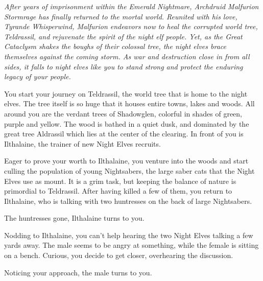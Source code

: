 
\textit{After years of imprisonment within the Emerald Nightmare, Archdruid Malfurion Stormrage has finally returned to the mortal world. Reunited with his love, Tyrande Whisperwind, Malfurion endeavors now to heal the corrupted world tree, Teldrassil, and rejuvenate the spirit of the night elf people. Yet, as the Great Cataclysm shakes the boughs of their colossal tree, the night elves brace themselves against the coming storm. As war and destruction close in from all sides, it falls to night elves like you to stand strong and protect the enduring legacy of your people.}

You start your journey on Teldrassil, the world tree that is home to the night elves. The tree itself is so huge that it houses entire towns, lakes and woods. All around you are the verdant trees of Shadowglen, colorful in shades of green, purple and yellow. The wood is bathed in a quiet dusk, and dominated by the great tree Aldrassil which lies at the center of the clearing. In front of you is Ilthalaine, the trainer of new Night Elves recruits.



Eager to prove your worth to Ilthalaine, you venture into the woods and start culling the population of young Nightsabers, the large saber cats that the Night Elves use as mount. It is a grim task, but keeping the balance of nature is primordial to Teldrassil. After having killed a few of them, you return to Ilthalaine, who is talking with two huntresses on the back of large Nightsabers.


The huntresses gone, Ilthalaine turns to you.


 

Nodding to Ilthalaine, you can't help hearing the two Night Elves talking a few yards away. The male seems to be angry at something, while the female is sitting on a bench. Curious, you decide to get closer, overhearing the discussion.


Noticing your approach, the male turns to you.

